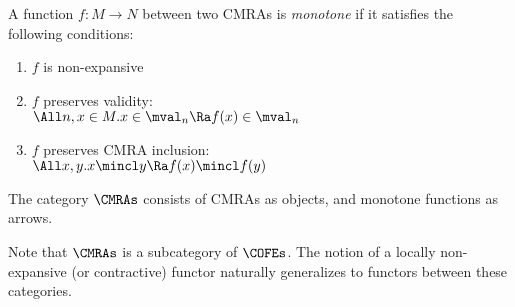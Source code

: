 
\begin{defn}
  A function $f : M \to N$ between two CMRAs is \emph{monotone} if it satisfies the following conditions:
  \begin{enumerate}[itemsep=0pt]
  \item $f$ is non-expansive
  \item $f$ preserves validity: \\
    $\All n, x \in M. x \in \mval_n \Ra f(x) \in \mval_n$
  \item $f$ preserves CMRA inclusion:\\
    $\All x, y. x \mincl y \Ra f(x) \mincl f(y)$
  \end{enumerate}
\end{defn}

\begin{defn}
  The category $\CMRAs$ consists of CMRAs as objects, and monotone functions as arrows.
\end{defn}
Note that $\CMRAs$ is a subcategory of $\COFEs$.
The notion of a locally non-expansive (or contractive) functor naturally generalizes to functors between these categories.


